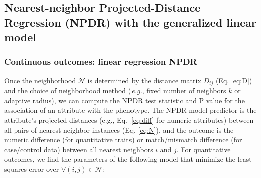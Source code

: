 \documentclass[10pt]{article}
\begin{document}
\subsection{Nearest-neighbor Projected-Distance Regression (NPDR) with the generalized linear model}

\subsubsection{Continuous outcomes: linear regression NPDR}\label{sec:regress}

Once the neighborhood $\mathcal{N}$ is determined by the distance matrix $D_{ij}$ (Eq. \ref{eq:D}) and the choice of neighborhood method ({\it e.g.}, fixed number of neighbors $k$ or adaptive radius), we can compute the NPDR test statistic and P value for the association of an attribute with the phenotype. The NPDR model predictor is the attribute's projected distances (e.g., Eq.~\ref{eq:diff} for numeric attributes) between all pairs of nearest-neighbor instances (Eq. \ref{eq:N}), and the outcome is the numeric difference (for quantitative traits) or match/mismatch difference (for case/control data) between all nearest neighbors $i$ and $j$. For quantitative outcomes, we find the parameters of the following model that minimize the least-squares error over $\forall(i,j) \in \mathcal{N}$: 

\end{document}
